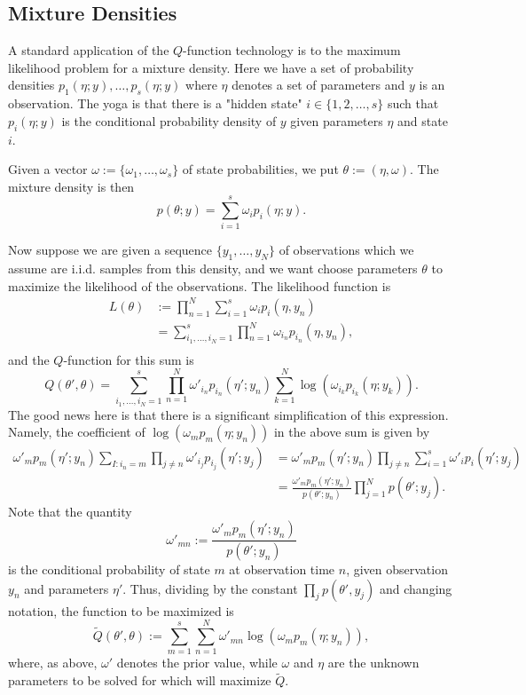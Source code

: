 \documentclass[12pt,leqno]{article}
\begin{document}
\subsection{Mixture Densities}\label{MD}
A standard application of the $Q$-function technology is to the maximum
likelihood problem for a mixture density.  Here we have a set of
probability densities $p_1(\eta;y),\dots,p_s(\eta;y)$ where $\eta$
denotes a set of parameters and $y$ is an observation.  The yoga is that there
is a "hidden state" $i\in\{1,2,\dots,s\}$ such that $p_i(\eta;y)$ is the
conditional probability density of $y$ given parameters $\eta$ and state $i$.

Given a vector $\omega:= \{\omega_1,\dots,\omega_s\}$ of state probabilities, we put
$\theta:= (\eta,\omega)$.  The mixture density is then
$$
p(\theta;y) = \sum_{i=1}^s\omega_ip_i(\eta;y).
$$

Now suppose we are given a sequence $\{y_1,\dots,y_N\}$ of observations which we
assume are i.i.d. samples from this density,
and we want choose parameters $\theta$ to maximize the likelihood of the observations.
The likelihood function is  
\begin{equation*} \begin{split} 
L(\theta)
&:= \prod_{n=1}^N\sum_{i=1}^s\omega_ip_i(\eta,y_n) \\ 
&=
\sum_{i_1,\dots,i_N=1}^s\prod_{n=1}^N\omega_{i_n}p_{i_n}(\eta,y_n), \\ 
\end{split} 
\end{equation*} 
and the $Q$-function for this sum is 
$$
Q(\theta',\theta) = \sum_{i_1,\dots,i_N=1}^s\prod_{n=1}^N\omega'_{i_n}p_{i_n}(\eta';y_n)
\sum_{k=1}^N\log(\omega_{i_k}p_{i_k}(\eta;y_k)).
$$
The good news here is that there is a significant simplification of this expression.
Namely, the coefficient of $\log(\omega_mp_m(\eta;y_n))$ in the above sum is given by
\begin{align*}
\omega'_mp_m(\eta';y_n)\sum_{I:i_n = m}\prod_{j\neq n}\omega'_{i_j}p_{i_j}(\eta';y_j )
&=\omega'_mp_m(\eta';y_n)\prod_{j\neq n}\sum_{i=1}^s\omega'_ip_i(\eta';y_j)\\
&= \frac{\omega'_mp_m(\eta';y_n)}{p(\theta';y_n)}\prod_{j=1}^Np(\theta';y_j).
\end{align*}
Note that the quantity 
\begin{equation}\label{omega_mn}
\omega'_{mn} := \frac{\omega'_mp_m(\eta';y_n)}{p(\theta';y_n)}
\end{equation}
is the conditional probability of state $m$ at observation time $n$, given observation $y_n$ 
and parameters $\eta'$.
Thus, dividing by the constant $\prod_jp(\theta',y_j)$ and changing notation, the function to be
maximized is
\begin{equation}\label{Qfunc:0}
\tilde{Q}(\theta',\theta) := \sum_{m=1}^s\sum_{n=1}^N\omega'_{mn}\log(\omega_mp_m(\eta;y_n)),
\end{equation}
where, as above, $\omega'$ denotes the prior value, while $\omega$ and $\eta$ are the unknown parameters
to be solved for which will maximize $\tilde{Q}$.
\end{document}
